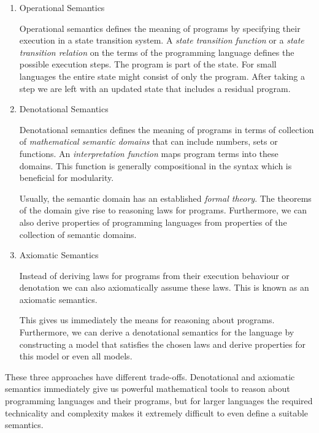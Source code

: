 {\begin{enumerate}
\item Operational Semantics

  Operational semantics defines the meaning of programs by specifying their
  execution in a state transition system. A \emph{state transition function} or
  a \emph{state transition relation} on the terms of the programming language
  defines the possible execution steps. The program is part of the state. For
  small languages the entire state might consist of only the program. After
  taking a step we are left with an updated state that includes a residual
  program.


\item Denotational Semantics

  Denotational semantics defines the meaning of programs in terms of collection
  of \emph{mathematical semantic domains} that can include numbers, sets or
  functions. An \emph{interpretation function} maps program terms into these
  domains. This function is generally compositional in the syntax which is
  beneficial for modularity.

  Usually, the semantic domain has an established \emph{formal theory}. The
  theorems of the domain give rise to reasoning laws for programs. Furthermore,
  we can also derive properties of programming languages from properties of the
  collection of semantic domains.

\item Axiomatic Semantics

  Instead of deriving laws for programs from their execution behaviour or
  denotation we can also axiomatically assume these laws. This is known as an
  axiomatic semantics.

  This gives us immediately the means for reasoning about programs. Furthermore,
  we can derive a denotational semantics for the language by constructing a
  model that satisfies the chosen laws and derive properties for this model or
  even all models.

\end{enumerate}

These three approaches have different trade-offs. Denotational and axiomatic
semantics immediately give us powerful mathematical tools to reason about
programming languages and their programs, but for larger languages the required
technicality and complexity makes it extremely difficult to even define a
suitable semantics.

}
